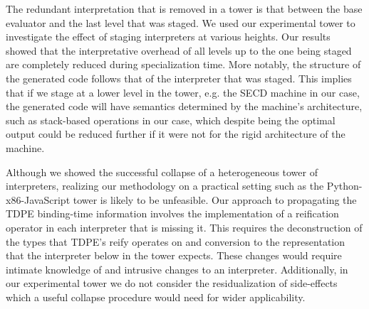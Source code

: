 \documentclass[a4paper,12pt,twoside,openright]{report}
\theoremstyle{definition}
\begin{document}
The redundant interpretation that is removed in a tower is that between the base evaluator and the last level that was staged. We used our experimental tower to investigate the effect of staging interpreters at various heights. Our results showed that the interpretative overhead of all levels up to the one being staged are completely reduced during specialization time. More notably, the structure of the generated code follows that of the interpreter that was staged. This implies that if we stage at a lower level in the tower, e.g. the SECD machine in our case, the generated code will have semantics determined by the machine's architecture, such as stack-based operations in our case, which despite being the optimal output could be reduced further if it were not for the rigid architecture of the machine.

Although we showed the successful collapse of a heterogeneous tower of interpreters, realizing our methodology on a practical setting such as the Python-x86-JavaScript tower is likely to be unfeasible. Our approach to propagating the TDPE binding-time information involves the implementation of a reification operator in each interpreter that is missing it. This requires the deconstruction of the types that TDPE's reify operates on and conversion to the representation that the interpreter below in the tower expects. These changes would require intimate knowledge of and intrusive changes to an interpreter. Additionally, in our experimental tower we do not consider the residualization of side-effects which a useful collapse procedure would need for wider applicability.
\end{document}
